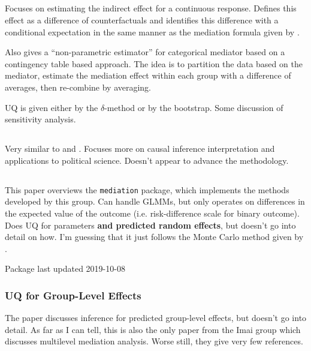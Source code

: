 \documentclass{article}
\begin{document}
\subsection{\citet{Ima10II}}

Focuses on estimating the indirect effect for a continuous response. Defines this effect as a difference of counterfactuals and identifies this difference with a conditional expectation in the same manner as the mediation formula given by \citet{Pea12}. 

Also gives a ``non-parametric estimator'' for categorical mediator based on a contingency table based approach. The idea is to partition the data based on the mediator, estimate the mediation effect within each group with a difference of averages, then re-combine by averaging.

UQ is given either by the $\delta$-method or by the bootstrap. Some discussion of sensitivity analysis.


\subsection{\citet{Ima11}}

Very similar to \citet{Ima10I} and \citet{Ima10II}. Focuses more on causal inference interpretation and applications to political science. Doesn't appear to advance the methodology.

\subsection{\citet{Tin14}}

This paper overviews the \texttt{mediation} package, which implements the methods developed by this group. Can handle GLMMs, but only operates on differences in the expected value of the outcome (i.e. risk-difference scale for binary outcome). Does UQ for parameters \textbf{and predicted random effects}, but doesn't go into detail on how. I'm guessing that it just follows the Monte Carlo method given by \citet{Ima10I}.

Package last updated 2019-10-08

\subsubsection{UQ for Group-Level Effects}

The \citet{Tin14} paper discusses inference for predicted group-level effects, but doesn't go into detail. As far as I can tell, this is also the only paper from the Imai group which discusses multilevel mediation analysis. Worse still, they give very few references.
\end{document}

